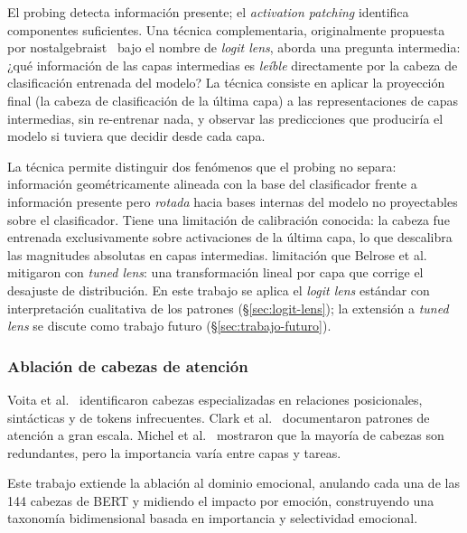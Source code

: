 El probing detecta información presente; el \emph{activation patching} identifica
componentes suficientes. Una técnica complementaria, originalmente propuesta
por nostalgebraist~\cite{nostalgebraist2020logit} bajo el nombre de
\textit{logit lens}, aborda una pregunta intermedia: ¿qué información de las
capas intermedias es \emph{leíble} directamente por la cabeza de
clasificación entrenada del modelo? La técnica consiste en aplicar la
proyección final (la cabeza de clasificación de la última capa) a las
representaciones de capas intermedias, sin re-entrenar nada, y observar las
predicciones que produciría el modelo si tuviera que decidir desde cada capa.

La técnica permite distinguir dos fenómenos que el probing no separa:
información geométricamente alineada con la base del clasificador frente a
información presente pero \emph{rotada} hacia bases internas del modelo no
proyectables sobre el clasificador. Tiene una limitación de calibración
conocida: la cabeza fue entrenada exclusivamente sobre activaciones de la
última capa, lo que descalibra las magnitudes absolutas en capas intermedias.
limitación que Belrose et al.~\cite{belrose2023eliciting} mitigaron con
\textit{tuned lens}: una transformación lineal por capa que corrige el
desajuste de distribución. En este trabajo se aplica el \emph{logit lens} estándar
con interpretación cualitativa de los patrones (\S\ref{sec:logit-lens}); la
extensión a \emph{tuned lens} se discute como trabajo futuro
(\S\ref{sec:trabajo-futuro}).

\subsubsection{Ablación de cabezas de atención}
\label{sec:sota-ablacion}

Voita et al.\ \cite{voita2019analyzing} identificaron cabezas especializadas en
relaciones posicionales, sintácticas y de tokens infrecuentes. Clark et al.\
\cite{clark2019what} documentaron patrones de atención a gran escala. Michel et al.\
\cite{michel2019sixteen} mostraron que la mayoría de cabezas son redundantes, pero
la importancia varía entre capas y tareas.

Este trabajo extiende la ablación al dominio emocional, anulando cada una de las
144 cabezas de BERT y midiendo el impacto por emoción, construyendo una taxonomía
bidimensional basada en importancia y selectividad emocional.

